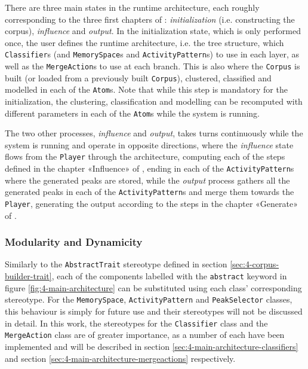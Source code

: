  There are three main states in the runtime architecture, each roughly corresponding to the three first chapters of \cite{somaxtheory2021}: \textit{initialization} (i.e. constructing the corpus), \textit{influence} and \textit{output}.  In the initialization state, which is only performed once, the user defines the runtime architecture, i.e. the tree structure, which \texttt{Classifier}s (and \texttt{Memory\-Space}s and \texttt{Activity\-Pattern}s) to use in each layer, as well as the \texttt{MergeAction}s to use at each branch. This is also where the \texttt{Corpus} is built (or loaded from a previously built \texttt{Corpus}), clustered, classified and modelled in each of the \texttt{Atom}s. Note that while this step is mandatory for the initialization, the clustering, classification and modelling can be recomputed with different parameters in each of the \texttt{Atom}s while the system is running. 
 
 The two other processes, \textit{influence} and \textit{output}, takes turns continuously while the system is running and operate in opposite directions, where the \textit{influence} state flows from the \texttt{Player} through the architecture, computing each of the steps defined in the chapter «Influence» of \cite{somaxtheory2021}, ending in each of the \texttt{ActivityPattern}s where the generated peaks are stored, while the \textit{output} process gathers all the generated peaks in each of the \texttt{ActivityPattern}s and merge them towards the \texttt{Player}, generating the output according to the steps in the chapter «Generate» of \cite{somaxtheory2021}.
 
 
 \subsubsection{Modularity and Dynamicity}\label{sec:4-main-architecture-modularity}
 Similarly to the \texttt{AbstractTrait} stereotype defined in section \ref{sec:4-corpus-builder-trait}, each of the components labelled with the \texttt{abstract} keyword in figure \ref{fig:4-main-architecture} can be substituted using each class' corresponding stereotype. For the \texttt{MemorySpace}, \texttt{ActivityPattern} and \texttt{PeakSelector} classes, this behaviour is simply for future use and their stereotypes will not be discussed in detail. In this work, the stereotypes for the \texttt{Classifier} class and the \texttt{MergeAction} class are of greater importance, as a number of each have been implemented and will be described in section \ref{sec:4-main-architecture-classifiers} and section \ref{sec:4-main-architecture-mergeactions} respectively.
 
